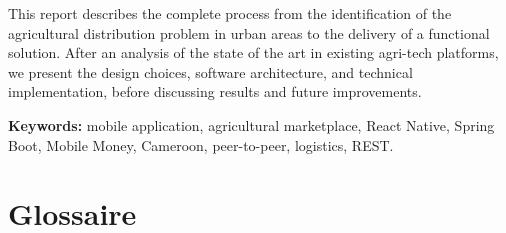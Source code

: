 \documentclass[12pt, a4paper, oneside]{report}
\begin{document}
This report describes the complete process from the identification of the agricultural
distribution problem in urban areas to the delivery of a functional solution. After an
analysis of the state of the art in existing agri-tech platforms, we present the design
choices, software architecture, and technical implementation, before discussing results and
future improvements.

\vspace{1em}
\noindent\textbf{Keywords:} mobile application, agricultural marketplace, React Native,
Spring Boot, Mobile Money, Cameroon, peer-to-peer, logistics, REST.

\listoffigures
{}

\listoftables
{}

%
%
\printglossary[
  type=\acronymtype,            %
  title={Liste des Abréviations},
  style=long,                   %
  nogroupskip                   %
]

\chapter*{Glossaire}
\end{document}
